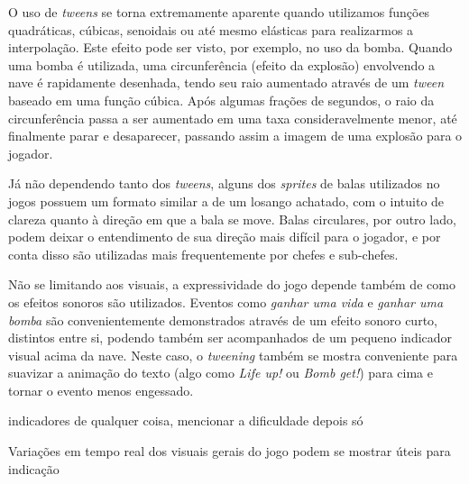 O uso de \textit{tweens} se torna extremamente aparente quando utilizamos funções quadráticas, cúbicas, senoidais ou até mesmo elásticas para realizarmos a interpolação. Este efeito pode ser visto, por exemplo, no uso da bomba. Quando uma bomba é utilizada, uma circunferência (efeito da explosão) envolvendo a nave é rapidamente desenhada, tendo seu raio aumentado através de um \textit{tween} baseado em uma função cúbica. Após algumas frações de segundos, o raio da circunferência passa a ser aumentado em uma taxa consideravelmente menor, até finalmente parar e desaparecer, passando assim a imagem de uma explosão para o jogador.

Já não dependendo tanto dos \textit{tweens}, alguns dos \textit{sprites} de balas utilizados no jogos possuem um formato similar a de um losango achatado, com o intuito de clareza quanto à direção em que a bala se move. Balas circulares, por outro lado, podem deixar o entendimento de sua direção mais difícil para o jogador, e por conta disso são utilizadas mais frequentemente por chefes e sub-chefes.

Não se limitando aos visuais, a expressividade do jogo depende também de como os efeitos sonoros são utilizados. Eventos como \textit{ganhar uma vida} e \textit{ganhar uma bomba} são convenientemente demonstrados através de um efeito sonoro curto, distintos entre si, podendo também ser acompanhados de um pequeno indicador visual acima da nave. Neste caso, o \textit{tweening} também se mostra conveniente para suavizar a animação do texto (algo como \textit{Life up!} ou \textit{Bomb get!}) para cima e tornar o evento menos engessado.

indicadores de qualquer coisa, mencionar a dificuldade depois só

Variações em tempo real dos visuais gerais do jogo podem se mostrar úteis para indicação 